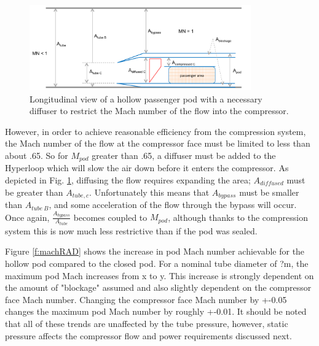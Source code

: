 \documentclass[heading.tex]{subfiles}
\begin{document}
\begin{figure}[hbtp]
\centering
\includegraphics[width=0.85\textwidth]{images/podC.png}
\caption{Longitudinal view of a hollow passenger pod with a necessary diffuser to restrict the Mach number of the flow into the compressor.}
\label{f:OpenPod}
\end{figure}

However, in order to achieve reasonable efficiency from the compression system, the Mach number of the flow at the compressor face
must be limited to less than about .65. So for $M_{pod}$ greater than .65, a diffuser must be added to the Hyperloop 
which will slow the air down before it enters the compressor. As depicted in Fig. \ref{f:OpenPod}, diffusing the flow 
requires expanding the area; $A_{diffused}$ must be greater than $A_{tube,c}$. Unfortunately this means that
$A_{bypass}$ must be smaller than $A_{tube\ B}$, and some acceleration of the flow through the 
bypass will occur. Once again, $\frac{A_{bypass}}{A_{tube}}$ becomes coupled to $M_{pod}$, although thanks to the compression 
system this is now much less restrictive than if the pod was sealed. 

Figure \ref{f:machRAD} shows the increase in pod Mach number achievable for the hollow pod compared to the closed pod.
For a nominal tube diameter of ?m, the maximum pod Mach increases from x to y.
This increase is strongly dependent on the amount of "blockage" assumed and also slightly dependent on the compressor face Mach number.
Changing the compressor face Mach number by +-0.05 changes the maximum pod Mach number by roughly +-0.01.
It should be noted that all of these trends are unaffected by the tube pressure,
however, static pressure affects the compressor flow and power requirements discussed next.
\end{document}
